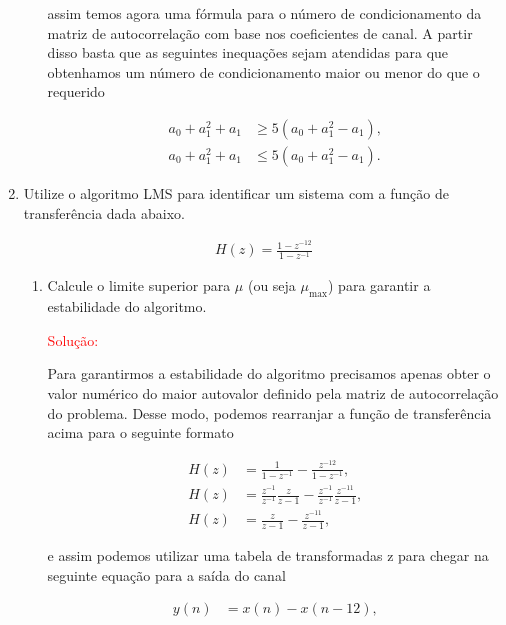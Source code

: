 \documentclass[a4paper,10pt]{article}
\begin{document}
\begin{enumerate}
\begin{enumerate}
						assim temos agora uma fórmula para o número de condicionamento da matriz de autocorrelação com base nos coeﬁcientes de canal. A partir disso basta que as seguintes inequações sejam atendidas para que
						obtenhamos um número de condicionamento maior ou menor do que o requerido

						\begin{align}
							a_{0} + a^{2}_{1} + a_{1} &\geq 5 (a_{0} + a^{2}_{1} - a_{1}), \\
							a_{0} + a^{2}_{1} + a_{1} &\leq 5 (a_{0} + a^{2}_{1} - a_{1}).
						\end{align}

				\end{enumerate}
			
			\item Utilize o algoritmo LMS para identiﬁcar um sistema com a função de transferência dada abaixo.
			
				\begin{align}
					H(z) = \frac{1 - z^{-12}}{1 - z^{-1}}
				\end{align}
			
				\begin{enumerate}
					
					\item Calcule o limite superior para $\mu$ (ou seja $\mu_{\text{max}}$) para garantir a estabilidade do algoritmo.
					
						\textcolor{red}{Solução:}
					
						Para garantirmos a estabilidade do algoritmo precisamos apenas obter o valor numérico do maior autovalor definido pela matriz de autocorrelação do problema.
						Desse modo, podemos rearranjar a função de transferência acima para o seguinte formato

						\begin{align}
							H(z) &= \frac{1}{1 - z^{-1}} - \frac{z^{-12}}{1 - z^{-1}}, \\
							H(z) &= \frac{z^{-1}}{z^{-1}} \frac{z}{z - 1} - \frac{z^{-1}}{z^{-1}}\frac{z^{-11}}{z - 1}, \\
							H(z) &= \frac{z}{z - 1} - \frac{z^{-11}}{z - 1},
						\end{align}

						e assim podemos utilizar uma tabela de transformadas z para chegar na seguinte equação para a saída do canal

						\begin{align}
							y(n) &= x(n) - x(n - 12), 
						\end{align}


\end{enumerate}
\end{enumerate}
\end{document}
